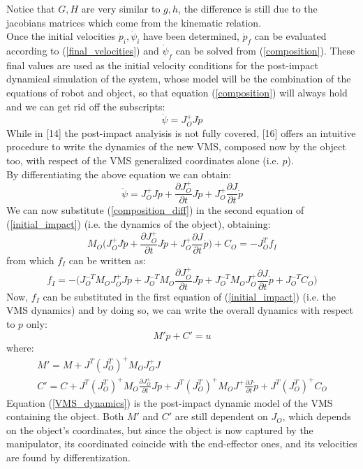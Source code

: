 \documentclass[a4paper,12pt,oneside]{report}
\begin{document}
Notice that $G,H$ are very similar to $g,h$, the difference is still due to the jacobians matrices which come from the kinematic relation.\\
Once the initial velocities $\dot{p}_i,\dot{\psi}_i$ have been determined, $\dot{p}_f$ can be evaluated according to (\ref{final_velocities}) and $\dot{\psi}_f$ can be solved from (\ref{composition}). These final values are used as the initial velocity conditions for the post-impact dynamical simulation of the system, whose model will be the combination of the equations of robot and object, so that equation (\ref{composition}) will always hold and we can get rid off the subscripts:
\begin{equation}
  \dot{\psi}=J_O^+J\dot{p}
\end{equation}
While in [14] the post-impact analyisis is not fully covered, [16] offers an intuitive procedure to write the dynamics of the new VMS, composed now by the object too, with respect of the VMS generalized coordinates alone (i.e. $p$).\\ 
By differentiating the above equation we can obtain:
\begin{equation}
  \ddot{\psi}=J_O^+J\ddot{p}+\frac{\partial J_O^+}{\partial t}J\dot{p}+J_O^+\frac{\partial J}{\partial t}\dot{p}
  \label{composition_diff}
\end{equation}
We can now substitute (\ref{composition_diff}) in the second equation of (\ref{initial_impact}) (i.e. the dynamics of the object), obtaining:
\begin{equation}
  M_O\Big(J_O^+J\ddot{p}+\frac{\partial J_O^+}{\partial t}J\dot{p}+J_O^+\frac{\partial J}{\partial t}\dot{p}\Big)+C_O=-J_O^Tf_I
\end{equation}
from which $f_I$ can be written as:
\begin{equation}
  f_I=-\Big(J_O^{-T}M_OJ_O^+J\ddot{p}+J_O^{-T}M_O\frac{\partial J_O^+}{\partial t}J\dot{p}+J_O^{-T}M_OJ_O^+\frac{\partial J}{\partial t}\dot{p}+J_O^{-T}C_O\Big)
\end{equation}
Now, $f_I$ can be substituted in the first equation of (\ref{initial_impact}) (i.e. the VMS dynamics) and by doing so, we can write the overall dynamics with respect to $p$ only:
\begin{equation}
  M'\ddot{p}+C'=u
  \label{final_equation_motion}
\end{equation}
where:
\begin{equation}
  \begin{array}{l}
    M'=M+J^T(J_O^T)^+M_OJ_O^+J\\
    C'=C+J^T(J_O^T)^+M_O\frac{\partial J_O^+}{\partial t}J\dot{p}+J^T(J_O^T)^+M_OJ^+\frac{\partial J}{\partial t}\dot{p}+J^T(J_O^T)^+C_O
  \end{array}
  \label{VMS_dynamics}
\end{equation}
Equation (\ref{VMS_dynamics}) is the post-impact dynamic model of the VMS containing the object. Both $M'$ and $C'$ are still dependent on $J_O$, which depends on the object's coordinates, but since the object is now captured by the manipulator, its coordinated coincide with the end-effector ones, and its velocities are found by differentization.
\end{document}
